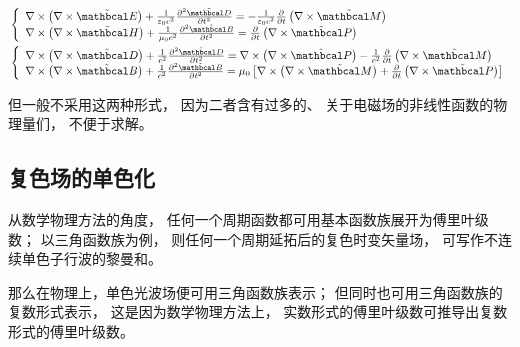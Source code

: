 {\setlength\abovedisplayskip{0pt} %
\setlength\belowdisplayskip{0pt}
\begin{align}
	&\left\{ \begin{array}{l}
		\nabla  \times \left( {\nabla  \times \tilde {\mathbcal E}} \right) + \frac{1}{{{\varepsilon _0}{c^2}}}\frac{{{\partial ^2}\tilde {\mathbcal D}}}{{\partial {t^2}}} =  - \frac{1}{{{\varepsilon _0}{c^2}}}\frac{\partial }{{\partial t}}\left( {\nabla  \times \tilde {\mathbcal M}} \right)\\
		\nabla  \times \left( {\nabla  \times \tilde {\mathbcal H}} \right) + \frac{1}{{{\mu _0}{c^2}}}\frac{{{\partial ^2}\tilde {\mathbcal B}}}{{\partial {t^2}}} = \frac{\partial }{{\partial t}}\left( {\nabla  \times \tilde {\mathbcal P}} \right)
		\end{array} \right.\\
	&\left\{ \begin{array}{l}
		\nabla  \times \left( {\nabla  \times \tilde {\mathbcal D}} \right) + \frac{1}{{{c^2}}}\frac{{{\partial ^2}\tilde {\mathbcal D}}}{{\partial {t^2}}} = \nabla  \times \left( {\nabla  \times \tilde {\mathbcal P}} \right) - \frac{1}{{{c^2}}}\frac{\partial }{{\partial t}}\left( {\nabla  \times \tilde {\mathbcal M}} \right)\\
		\nabla  \times \left( {\nabla  \times \tilde {\mathbcal B}} \right) + \frac{1}{{{c^2}}}\frac{{{\partial ^2}\tilde {\mathbcal B}}}{{\partial {t^2}}} = {\mu _0}\left[ {\nabla  \times \left( {\nabla  \times \tilde {\mathbcal M}} \right) + \frac{\partial }{{\partial t}}\left( {\nabla  \times \tilde {\mathbcal P}} \right)} \right]
		\end{array} \right.
\end{align}
}

但一般不采用这两种形式， 因为二者含有过多的、 关于电磁场的非线性函数的物理量们， 不便于求解。

\subsection{复色场的单色化}

从数学物理方法的角度， 任何一个周期函数都可用基本函数族展开为傅里叶级数； 以三角函数族为例， 
则任何一个周期延拓后的复色时变矢量场， 可写作不连续单色子行波的黎曼和。 

那么在物理上，单色光波场便可用三角函数族表示； 但同时也可用三角函数族的复数形式表示， 
这是因为数学物理方法上， 实数形式的傅里叶级数可推导出复数形式的傅里叶级数。 

